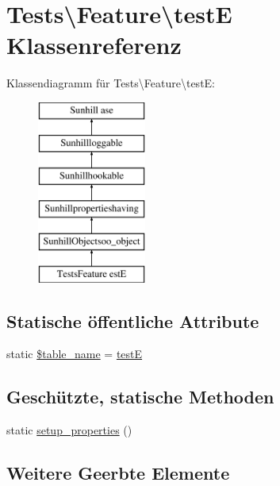 \hypertarget{classTests_1_1Feature_1_1testE}{}\section{Tests\textbackslash{}Feature\textbackslash{}testE Klassenreferenz}
\label{classTests_1_1Feature_1_1testE}
Klassendiagramm für Tests\textbackslash{}Feature\textbackslash{}testE\+:\begin{figure}[H]
\begin{center}
\leavevmode
\includegraphics[height=6.000000cm]{df/d1c/classTests_1_1Feature_1_1testE}
\end{center}
\end{figure}
\subsection*{Statische öffentliche Attribute}
\begin{DoxyCompactItemize}
\item 
static \hyperlink{classTests_1_1Feature_1_1testE_aa001b6e48f65835d88165c04ffe986b3}{\$table\+\_\+name} = \textquotesingle{}\hyperlink{classTests_1_1Feature_1_1testE}{testE}\textquotesingle{}
\end{DoxyCompactItemize}
\subsection*{Geschützte, statische Methoden}
\begin{DoxyCompactItemize}
\item 
static \hyperlink{classTests_1_1Feature_1_1testE_a2a47356fa3e500e59dc17247246030eb}{setup\+\_\+properties} ()
\end{DoxyCompactItemize}
\subsection*{Weitere Geerbte Elemente}


